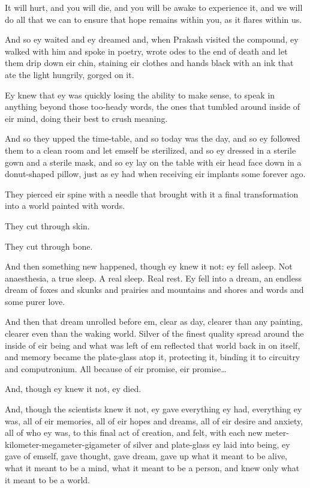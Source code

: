 It will hurt, and you will die, and you will be awake to experience it, and we will do all that we can to ensure that hope remains within you, as it flares within us.

And so ey waited and ey dreamed and, when Prakash visited the compound, ey walked with him and spoke in poetry, wrote odes to the end of death and let them drip down eir chin, staining eir clothes and hands black with an ink that ate the light hungrily, gorged on it.

Ey knew that ey was quickly losing the ability to make sense, to speak in anything beyond those too-heady words, the ones that tumbled around inside of eir mind, doing their best to crush meaning.

And so they upped the time-table, and so today was the day, and so ey followed them to a clean room and let emself be sterilized, and so ey dressed in a sterile gown and a sterile mask, and so ey lay on the table with eir head face down in a donut-shaped pillow, just as ey had when receiving eir implants some forever ago.

They pierced eir spine with a needle that brought with it a final transformation into a world painted with words.

They cut through skin.

They cut through bone.

And then something new happened, though ey knew it not: ey fell asleep. Not anaesthesia, a true sleep. A real sleep. Real rest. Ey fell into a dream, an endless dream of foxes and skunks and prairies and mountains and shores and words and some purer love.

And then that dream unrolled before em, clear as day, clearer than any painting, clearer even than the waking world. Silver of the finest quality spread around the inside of eir being and what was left of em reflected that world back in on itself, and memory became the plate-glass atop it, protecting it, binding it to circuitry and computronium. All because of eir promise, eir promise\ldots

And, though ey knew it not, ey died.

And, though the scientists knew it not, ey gave everything ey had, everything ey was, all of eir memories, all of eir hopes and dreams, all of eir desire and anxiety, all of who ey was, to this final act of creation, and felt, with each new meter-kilometer-megameter-gigameter of silver and plate-glass ey laid into being, ey gave of emself, gave thought, gave dream, gave up what it meant to be alive, what it meant to be a mind, what it meant to be a person, and knew only what it meant to be a world.

